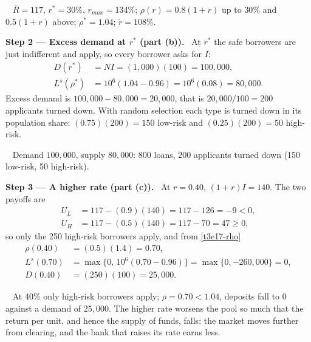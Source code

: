 \documentclass[11pt,a4paper]{article}
\newcommand{\step}[2]{\par\medskip\noindent\textbf{Step #1 --- #2.}~}
\newcommand{\answer}[1]{\par\smallskip\noindent\fbox{\textbf{Answer #1.}}~}
\begin{document}
\answer{(a)} $\bar R=117$, $r^*=30\%$, $r_{max}=134\%$; $\rho(r)=0.8(1+r)$ up to $30\%$ and $0.5(1+r)$ above; $\rho^*=1.04$; $\tilde r=108\%$.

\step{2}{Excess demand at $r^*$ (part (b))} At $r^*$ the safe borrowers are just indifferent and apply, so every borrower asks for $I$:
\begin{align}
  D(r^*) &= NI = (1{,}000)(100) = 100{,}000, \nonumber\\
  L^s(\rho^*) &= 10^6(1.04-0.96) = 10^6(0.08) = 80{,}000. \nonumber
\end{align}
Excess demand is $100{,}000-80{,}000=20{,}000$, that is $20{,}000/100=200$ applicants turned down. With random selection each type is turned down in its population share: $(0.75)(200)=150$ low-risk and $(0.25)(200)=50$ high-risk.

\answer{(b)} Demand $100{,}000$, supply $80{,}000$: 800 loans, 200 applicants turned down (150 low-risk, 50 high-risk).

\step{3}{A higher rate (part (c))} At $r=0.40$, $(1+r)I=140$. The two payoffs are
\begin{align}
  U_L &= 117-(0.9)(140) = 117-126 = -9 < 0, \nonumber\\
  U_H &= 117-(0.5)(140) = 117-70 = 47 \ge 0, \nonumber
\end{align}
so only the 250 high-risk borrowers apply, and from \eqref{t3e17-rho}
\begin{align}
  \rho(0.40) &= (0.5)(1.4) = 0.70, \nonumber\\
  L^s(0.70) &= \max\{0,\,10^6(0.70-0.96)\} = \max\{0,-260{,}000\} = 0, \nonumber\\
  D(0.40) &= (250)(100) = 25{,}000. \nonumber
\end{align}

\answer{(c)} At $40\%$ only high-risk borrowers apply; $\rho=0.70<1.04$, deposits fall to 0 against a demand of $25{,}000$. The higher rate worsens the pool so much that the return per unit, and hence the supply of funds, falls: the market moves further from clearing, and the bank that raises its rate earns less.
\end{document}
